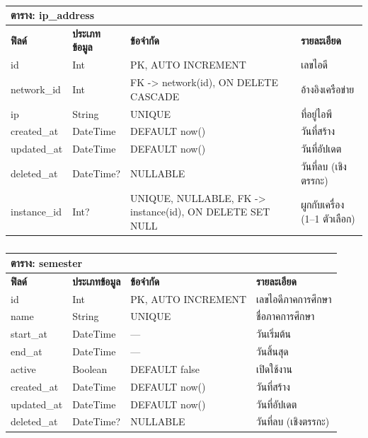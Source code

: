 \begin{table}[htbp]
    \caption{}\label{tab3:ip_address_fields}
    \centering
    \renewcommand{\arraystretch}{1.2}
    \small
    \begin{tabular}{p{} p{} p{} p{}}
        \hline
        \multicolumn{4}{l}{\textbf{ตาราง: ip\_address}} \\
        \hline
            \textbf{ฟิลด์} & \textbf{ประเภทข้อมูล} & \textbf{ข้อจำกัด} & \textbf{รายละเอียด} \\
        \hline
        id & Int & PK, AUTO INCREMENT & เลขไอดี \\
        network\_id & Int & FK -> network(id), ON DELETE CASCADE & อ้างอิงเครือข่าย \\
        ip & String & UNIQUE & ที่อยู่ไอพี \\
        created\_at & DateTime & DEFAULT now() & วันที่สร้าง \\
        updated\_at & DateTime & DEFAULT now() & วันที่อัปเดต \\
        deleted\_at & DateTime? & NULLABLE & วันที่ลบ (เชิงตรรกะ) \\
        instance\_id & Int? & UNIQUE, NULLABLE, FK -> instance(id), ON DELETE SET NULL & ผูกกับเครื่อง (1–1 ตัวเลือก) \\
        \hline
    \end{tabular}
\end{table}

\begin{table}[htbp]
    \caption{}\label{tab3:semester_fields}
    \centering
    \renewcommand{\arraystretch}{1.2}
    \small
    \begin{tabular}{p{} p{} p{} p{}}
        \hline
        \multicolumn{4}{l}{\textbf{ตาราง: semester}} \\
        \hline
            \textbf{ฟิลด์} & \textbf{ประเภทข้อมูล} & \textbf{ข้อจำกัด} & \textbf{รายละเอียด} \\
        \hline
        id & Int & PK, AUTO INCREMENT & เลขไอดีภาคการศึกษา \\
        name & String & UNIQUE & ชื่อภาคการศึกษา \\
        start\_at & DateTime & — & วันเริ่มต้น \\
        end\_at & DateTime & — & วันสิ้นสุด \\
        active & Boolean & DEFAULT false & เปิดใช้งาน \\
        created\_at & DateTime & DEFAULT now() & วันที่สร้าง \\
        updated\_at & DateTime & DEFAULT now() & วันที่อัปเดต \\
        deleted\_at & DateTime? & NULLABLE & วันที่ลบ (เชิงตรรกะ) \\
        \hline
    \end{tabular}
\end{table}

